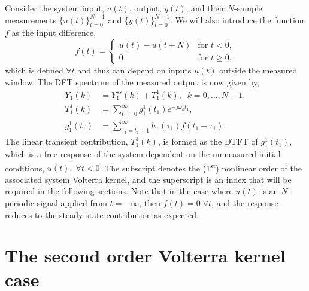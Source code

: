 Consider the system input, $u(t)$, output, $y(t)$, and their $N$-sample measurements $\{u(t)\}_{t=0}^{N-1}$ and $\{y(t)\}_{t=0}^{N-1}$. We will also introduce the function $f$ as the input difference,
\begin{equation}
\label{eq:f_Transients}
f(t) =  \begin{cases} u(t) - u(t+N) & \text{for } t<0, \\ 0 & \text{for } t \geq 0, \end{cases}
\end{equation}
which is defined $\forall t$ and thus can depend on inputs $u(t)$ outside the measured window. The DFT spectrum of the measured output is now given by,
\begin{equation}
\begin{aligned}
\label{eq:LinearResponse_Transients}
Y_1(k) &= Y_1^{ss}(k) + T_1^1(k), \; \; k = 0,\hdots,N-1,\\
T_1^1(k) &= \sum_{t_1=0}^{\infty} g_1^1(t_1) e^{-j \omega_k t_1}, \\
g_1^1(t_1) &= \sum_{\tau_1=t_1+1}^{\infty} h_1(\tau_1) f(t_1-\tau_1).
\end{aligned}
\end{equation}
The linear transient contribution, $T_1^1(k)$, is formed as the DTFT of $g_1^1(t_1)$, which is a free response of the system dependent on the unmeasured initial conditions, $u(t), \; \forall t<0$. The subscript denotes the (1\textsuperscript{st}) nonlinear order of the associated system Volterra kernel, and the superscript is an index that will be required in the following sections. Note that in the case where $u(t)$ is an $N$-periodic signal applied from $t=-\infty$, then $f(t)=0 \; \forall t$, and the response reduces to the steady-state contribution as expected.

\section{The second order Volterra kernel case}

\label{sec:SecondOrderCase_Transients}

